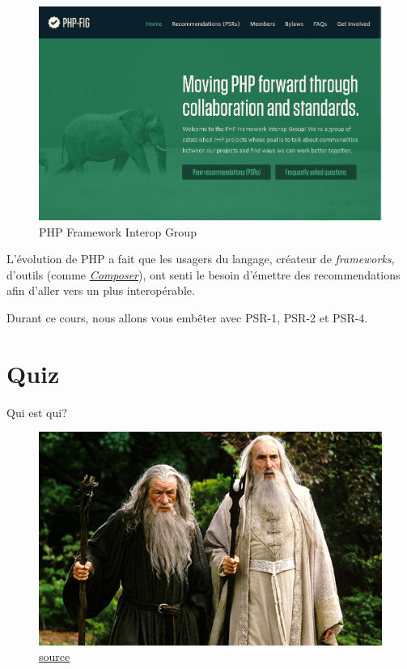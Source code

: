 \begin{figure}
\centering
\includegraphics{src/img/phpfig.png}
\caption{PHP Framework Interop Group}
\end{figure}

L'évolution de PHP a fait que les usagers du langage, créateur de
\emph{frameworks}, d'outils (comme
\href{http://getcomposer.org/}{\emph{Composer}}), ont senti le besoin
d'émettre des recommendations afin d'aller vers un plus interopérable.

Durant ce cours, nous allons vous embêter avec PSR-1, PSR-2 et PSR-4.

\hypertarget{quiz}{%
\section{Quiz}\label{quiz}}

Qui est qui?

\begin{figure}
\centering
\includegraphics{src/img/GandalfStaff5.jpg}
\caption{\href{http://hero.wikia.com/wiki/Gandalf}{source}}
\end{figure}


